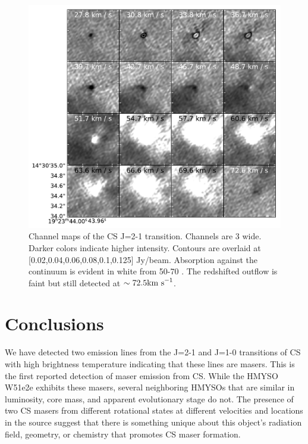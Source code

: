 \documentclass[twocolumn]{aastex62}
\begin{document}

\begin{figure}
    \includegraphics[]{figures/CS_maser_channel_maps.pdf}
    \caption{Channel maps of the CS J=2-1 transition.  Channels are 3 \kms
    wide.  Darker colors indicate higher intensity.  Contours are overlaid at
    [0.02,0.04,0.06,0.08,0.1,0.125] Jy/beam.  Absorption against the continuum
    is evident in white from 50-70 \kms.  The redshifted outflow is faint but still
    detected at
    $\sim72.5\textrm{km~s}^{-1}$.
    }
    \label{fig:channelmaps}
\end{figure}

\section{Conclusions}
We have detected two emission lines from the J=2-1 and J=1-0 transitions of CS
with high brightness temperature indicating that these lines are masers.
This is the first reported detection of maser emission from CS.
While the HMYSO W51e2e exhibits these masers, several neighboring HMYSOs that
are similar in luminosity, core mass, and apparent evolutionary stage
do not.  The presence of two CS masers from different rotational states
at different velocities and locations in the source suggest that there is something
unique about this object's radiation field, geometry, or chemistry that
promotes CS maser formation.
\end{document}

